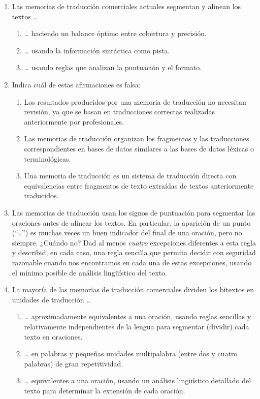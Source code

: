 \begin{enumerate}
\item Las memorias de traducción comerciales actuales segmentan y alinean los textos {\ldots} \begin{enumerate} \item {\ldots} haciendo un balance óptimo entre cobertura y precisión. \item {\ldots} usando la información sintáctica como pista. \item {\ldots} usando reglas que analizan la puntuación y el formato. \end{enumerate} 

\item Indica cuál de estas afirmaciones es falsa: \begin{enumerate} \item Los resultados producidos por una memoria de traducción no necesitan revisión, ya que se basan en traducciones correctas realizadas anteriormente por profesionales. \item Las memorias de traducción organizan los fragmentos y las traducciones correspondientes en bases de datos similares a las bases de datos léxicas o terminológicas. \item Una memoria de traducción es un sistema de traducción directa con equivalencias entre fragmentos de texto extraídas de textos anteriormente traducidos. \end{enumerate} 

\item Las memorias de traducción usan los signos de puntuación para segmentar las oraciones antes de alinear los textos. En particular, la aparición de un punto (``\texttt{.}'') es muchas veces un buen indicador del final de una oración, pero no siempre. ¿Cuándo no? Dad al menos \emph{cuatro} excepciones diferentes a esta regla y describid, en cada caso, una regla sencilla que permita decidir con seguridad razonable cuando nos encontramos en cada una de estas excepciones, usando el mínimo posible de análisis lingüístico del texto. 

\item La mayoría de las memorias de traducción comerciales dividen los bitextos en unidades de traducción {\ldots} \begin{enumerate} \item {\ldots} aproximadamente equivalentes a una oración, usando reglas sencillas y relativamente independientes de la lengua para segmentar (dividir) cada texto en oraciones. \item {\ldots} en palabras y pequeñas unidades multipalabra (entre dos y cuatro palabras) de gran repetitividad. \item {\ldots} equivalentes a una oración, usando un análisis lingüístico detallado del texto para determinar la extensión de cada oración. \end{enumerate} 


\end{enumerate}
